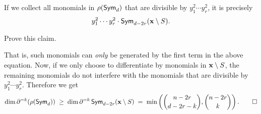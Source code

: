 \begin{claim}
  If we collect all monomials in $\rho(\operatorname{\mathsf{Sym}}_d)$ that are divisible by $y_1^2\cdots y_r^2$, it is precisely
  \[
    y_1^2 \cdots y_r^2 \cdot \operatorname{\mathsf{Sym}}_{d-2r}(\mathbf{x} \setminus S).
  \]
\end{claim}

\begin{exercise}
Prove this claim. 
\end{exercise}

That is, such monomials can \emph{only} be generated by the first term in the above equation. Now, if we only choose to differentiate by monomials in $\mathbf{x} \setminus S$, the remaining monomials do not interfere with the monomials that are divisible by $y_1^2 \cdots y_r^2$. Therefore we get
\[
  \dim \partial^{=k}(\rho(\operatorname{\mathsf{Sym}}_d)) \;\geq\; \dim \partial^{=k}\operatorname{\mathsf{Sym}}_{d-2r}(\mathbf{x} \setminus S) \;=\; \min\left(\binom{n-2r}{d-2r-k}, \binom{n-2r}{k}\right).\qed
\]








